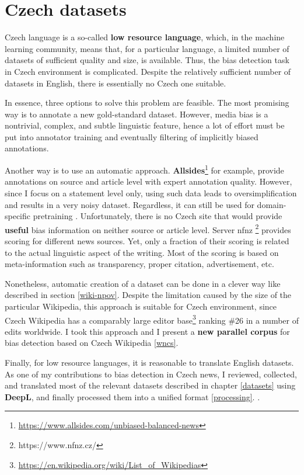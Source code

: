 \chapter{Czech datasets}
Czech language is a so-called \textbf{low resource language}, which, in the machine learning community, means that, for a particular language, a limited number of datasets of sufficient quality  and size, is available. Thus, the bias detection task in Czech environment is complicated. Despite the relatively sufficient number of datasets in English, there is essentially no Czech one suitable.

 In essence, three options to solve this problem are feasible. The most promising way is to annotate a new gold-standard dataset. However, media bias is a nontrivial, complex, and subtle linguistic feature, hence a lot of effort must be put into annotator training and eventually filtering of implicitly biased annotations.
 
 Another way is to use an automatic approach. \textbf{Allsides}\footnote{\url{https://www.allsides.com/unbiased-balanced-news}} for example, provide annotations on source and article level with expert annotation quality. However, since I focus on a statement level only, using such data leads to oversimplification and results in a very noisy dataset. Regardless, it can still be used for domain-specific pretraining \cite{Spinde2021f}. Unfortunately, there is no Czech site that would provide \textbf{useful} bias information on neither source or article level. Server \Gls{nfnz} \footnote{https://www.nfnz.cz/} provides scoring for different news sources. Yet, only a fraction of their scoring is related to the actual linguistic aspect of the writing. Most of the scoring is based on meta-information such as transparency, proper citation, advertisement, etc.
 
 Nonetheless, automatic creation of a dataset can be done in a clever way like described in section \ref{wiki-npov}. Despite the limitation caused by the size of the particular Wikipedia, this approach is suitable for Czech environment, since Czech Wikipedia has a comparably large editor base\footnote{ \url{https://en.wikipedia.org/wiki/List_of_Wikipedias}} ranking \#26 in a number of edits worldwide. I took this approach and I present a \textbf{new parallel corpus} for bias detection based on Czech Wikipedia \ref{wncs}.
 
 Finally, for low resource languages, it is reasonable to translate English datasets. As one of my contributions to bias detection in Czech news, I reviewed, collected, and translated most of the relevant datasets described in chapter \ref{datasets} using \textbf{DeepL}, and finally processed them into a unified format \ref{processing}. .
 
